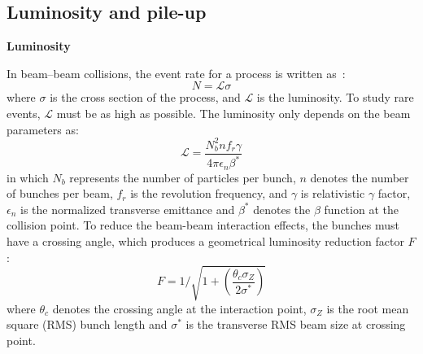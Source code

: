 \subsection{Luminosity and pile-up}

\textbf{Luminosity}

In beam–beam collisions, the event rate for a process is written as~\cite{Evans_2008}:
\begin{equation}
	N = \mathcal{L} \sigma
\end{equation}
where $\sigma$ is the cross section of the process, and $\mathcal{L}$ is the luminosity.
To study rare events, $\mathcal{L}$ must be as high as possible.
The luminosity only depends on the beam parameters as:
\begin{equation} \label{eq:lumi}
	\mathcal{L} = \frac{ N_{b}^{2} n f_{r} \gamma}{4\pi \epsilon_{n} \beta^{*}}
\end{equation}
in which $N_{b}$ represents the number of particles per bunch, $n$ denotes the number of bunches per beam,
$f_{r}$ is the revolution frequency, and $\gamma$ is relativistic $\gamma$ factor, 
$\epsilon_{n}$ is the normalized transverse emittance and $\beta^{*}$ denotes the $\beta$ function at the collision point.
To reduce the beam-beam interaction effects, the bunches must have a crossing angle,
which produces a geometrical luminosity reduction factor $F$:
\begin{equation}
	F = 1 / \sqrt{1 + \left( \frac{\theta_{c}\sigma_{Z}}{2\sigma^{*}} \right) }
\end{equation}
where $\theta_{c}$ denotes the crossing angle at the interaction point, $\sigma_{Z}$ is the root mean square (RMS) bunch length
and $\sigma^{*}$ is the transverse RMS beam size at crossing point.

